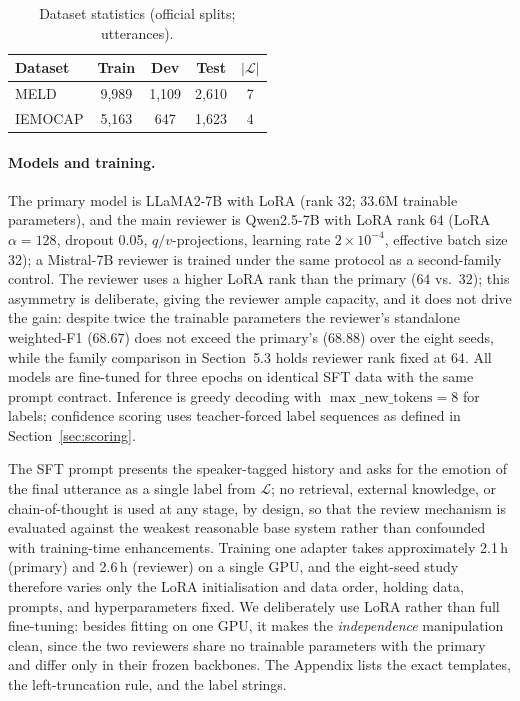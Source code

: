 \documentclass[final,5p,times,twocolumn]{elsarticle}
\begin{document}
\begin{table}[t]
\centering
\caption{Dataset statistics (official splits; utterances).}
\label{tab:data}
\small
\begin{tabular}{lcccc}
\toprule
Dataset & Train & Dev & Test & $|\mathcal L|$ \\
\midrule
MELD & 9{,}989 & 1{,}109 & 2{,}610 & 7 \\
IEMOCAP & 5{,}163 & 647 & 1{,}623 & 4 \\
\bottomrule
\end{tabular}
\end{table}

\paragraph{Models and training.}
The primary model is LLaMA2-7B \citep{touvron2023llama2} with LoRA
\citep{hu2022lora} (rank 32; 33.6M trainable parameters), and the main
reviewer is Qwen2.5-7B \citep{qwen25} with LoRA rank 64 (LoRA $\alpha{=}128$,
dropout 0.05, $q/v$-projections, learning rate $2\times10^{-4}$, effective
batch size 32); a Mistral-7B \citep{jiang2023mistral} reviewer is trained
under the same protocol as a second-family control. The reviewer uses a
higher LoRA rank than the primary ($64$ vs.\ $32$); this asymmetry is
deliberate, giving the reviewer ample capacity, and it does not drive the
gain: despite twice the trainable parameters the reviewer's standalone
weighted-F1 ($68.67$) does not exceed the primary's ($68.88$) over the eight
seeds, while the family comparison in Section~5.3 holds reviewer rank fixed
at $64$. All models are
fine-tuned for three epochs on identical SFT data with the same prompt
contract. Inference is greedy decoding with $\max\_\text{new\_tokens}{=}8$
for labels; confidence scoring uses teacher-forced label sequences as defined
in Section~\ref{sec:scoring}.

The SFT prompt presents the speaker-tagged history and asks for the emotion
of the final utterance as a single label from $\mathcal L$; no retrieval,
external knowledge, or chain-of-thought is used at any stage, by design, so
that the review mechanism is evaluated against the weakest reasonable base
system rather than confounded with training-time enhancements. Training one
adapter takes approximately 2.1\,h (primary) and 2.6\,h (reviewer) on a
single GPU, and the eight-seed study therefore varies only the LoRA
initialisation and data order, holding data, prompts, and hyperparameters
fixed. We deliberately use LoRA rather than full fine-tuning: besides
fitting on one GPU, it makes the \emph{independence} manipulation clean,
since the two reviewers share no trainable parameters with the primary and
differ only in their frozen backbones. The Appendix lists the exact
templates, the left-truncation rule, and the label strings.
\end{document}
